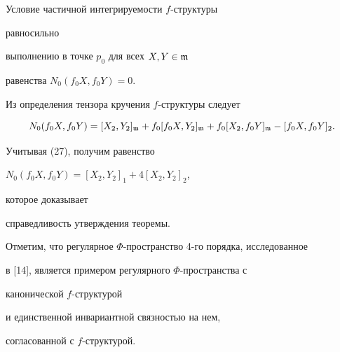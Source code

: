  


\begin{pf} Условие частичной интегрируемости $f$-структуры 


равносильно  


выполнению в точке $p_0$ для всех $X,Y\in\frak m$ 


равенства $N_0(f_0X,f_0Y)=0$.  


Из определения тензора кручения $f$-структуры следует 


$$ 


N_0(f_0X,f_0Y)=[X_2,Y_2]_{\frak m}+ 


f_0[f_0X,Y_2]_{\frak m}+f_0[X_2,f_0Y]_{\frak m}- 


[f_0X,f_0Y]_2. 


$$ 


Учитывая (27), получим равенство 


$N_0(f_0X,f_0Y)=[X_2,Y_2]_1+4[X_2,Y_2]_2$, 


которое доказывает 


справедливость утверждения теоремы. 


\end{pf} 


 


Отметим, что регулярное $\Phi$-пространство 4-го порядка, исследованное 


в [14], является примером регулярного $\Phi$-пространства с 


канонической $f$-структурой 


и единственной инвариантной связностью на нем, 


согласованной с $f$-структурой. 


 


